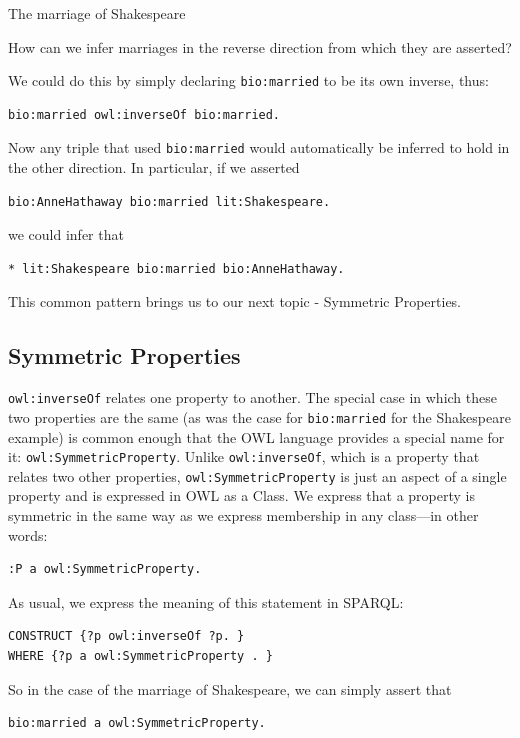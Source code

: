 \begin{challenge}{The marriage of Shakespeare}

How can we infer marriages in the reverse direction from which they are
asserted?

\solution

We could do this by simply declaring \texttt{bio:married} to be its own inverse,
thus:

\begin{lstlisting}
bio:married owl:inverseOf bio:married.
\end{lstlisting}

Now any triple that used \texttt{bio:married} would automatically be inferred to
hold in the other direction. In particular, if we asserted

\begin{lstlisting}
bio:AnneHathaway bio:married lit:Shakespeare.
\end{lstlisting}

we could infer that

\begin{lstlisting}
* lit:Shakespeare bio:married bio:AnneHathaway.
\end{lstlisting}

This common pattern brings us to our next topic - Symmetric Properties. 

\subsection{Symmetric Properties}

\texttt{owl:inverseOf} relates one property to another. The special case in which
these two properties are the same (as was the case for \texttt{bio:married} for
the Shakespeare example) is common enough that the OWL language provides
a special name for it: \texttt{owl:SymmetricProperty}. Unlike \texttt{owl:inverseOf},
which is a property that relates two other properties,
\texttt{owl:SymmetricProperty} is just an aspect of a single property and is
expressed in OWL as a Class. We express that a property is symmetric in
the same way as we express membership in any class---in other words:

\begin{lstlisting}
:P a owl:SymmetricProperty.
\end{lstlisting}

As usual, we express the meaning of this statement in SPARQL:

\begin{lstlisting}
CONSTRUCT {?p owl:inverseOf ?p. }
WHERE {?p a owl:SymmetricProperty . }
\end{lstlisting}

So in the case of the marriage of Shakespeare, we can simply assert that

\begin{lstlisting}
bio:married a owl:SymmetricProperty.
\end{lstlisting}
\end{challenge}


